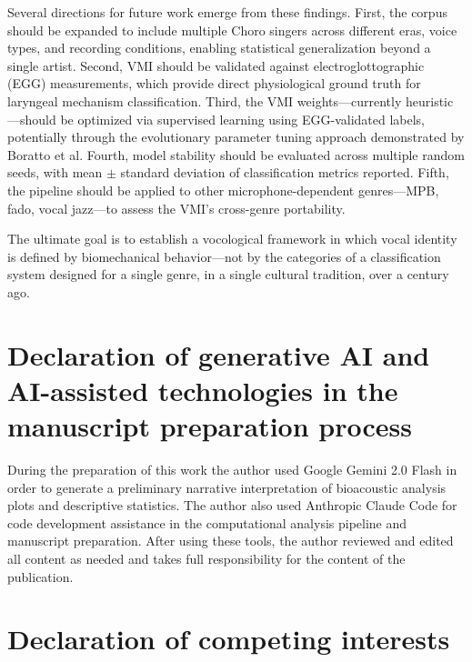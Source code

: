 \documentclass[review,3p,number]{elsarticle}
\begin{document}
Several directions for future work emerge from these findings. First, the corpus
should be expanded to include multiple Choro singers across different eras, voice
types, and recording conditions, enabling statistical generalization beyond a single
artist. Second, VMI should be validated against electroglottographic (EGG)
measurements, which provide direct physiological ground truth for laryngeal mechanism
classification.\cite{henrich2004} Third, the VMI weights---currently
heuristic---should be optimized via supervised learning using EGG-validated labels,
potentially through the evolutionary parameter tuning approach demonstrated by
Boratto et al.\cite{boratto2025} Fourth, model stability should be evaluated across
multiple random seeds, with mean $\pm$ standard deviation of classification metrics
reported. Fifth, the
pipeline should be applied to other microphone-dependent genres---MPB, fado, vocal
jazz---to assess the VMI's cross-genre portability.

The ultimate goal is to establish a vocological framework in which vocal identity is
defined by biomechanical behavior---not by the categories of a classification system
designed for a single genre, in a single cultural tradition, over a century ago.

\section*{Declaration of generative AI and AI-assisted technologies in the
manuscript preparation process}

During the preparation of this work the author used Google Gemini 2.0 Flash in order
to generate a preliminary narrative interpretation of bioacoustic analysis plots and
descriptive statistics. The author also used Anthropic Claude Code for code
development assistance in the computational analysis pipeline and manuscript
preparation. After using these tools, the author reviewed and edited all content as
needed and takes full responsibility for the content of the publication.

\section*{Declaration of competing interests}
\end{document}
